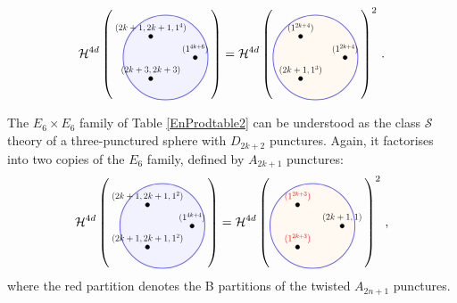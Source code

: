 \documentclass[a4paper,11pt]{article}
\begin{document}
\begin{compactitem}
\begin{equation}
   \mathcal{H}^{4d} \left( \raisebox{-.5\height}{\scalebox{.6}{\begin{tikzpicture}
        \filldraw[color=blue!60, fill=blue!5, very thick](0,0) circle (2);
        \filldraw[fill=black!100] (1.4,0) circle (.1);
        \filldraw[fill=black!100] (-.7,1) circle (.1);
        \filldraw[fill=black!100] (-.7,-1) circle (.1);
        \node at (1.4,.4) {\large $(1^{4k+6})$};
        \node at (-.7,1.4) {\large$(2k+1,2k+1,1^4)$};
        \node at (-.7,-.6) {\large$(2k+3,2k+3)$};
    \end{tikzpicture}}} \right) =  \mathcal{H}^{4d} \left( \raisebox{-.5\height}{\scalebox{.6}{\begin{tikzpicture}
        \filldraw[color=blue!60, fill=orange!5, very thick](0,0) circle (2);
        \filldraw[fill=black!100] (1.4,0) circle (.1);
        \filldraw[fill=black!100] (-.7,1) circle (.1);
        \filldraw[fill=black!100] (-.7,-1) circle (.1);
        \node at (1.4,.4) {\large $(1^{2k+4})$};
        \node at (-.7,1.4) {\large$(1^{2k+4})$};
        \node at (-.7,-.6) {\large$(2k+1,1^3)$};
    \end{tikzpicture}}} \right)^2 \, .
    \label{eq:class-S_E7xE7}
\end{equation}
%
\item The $E_6\times E_6$ family of Table \ref{EnProdtable2} can be understood as the class $\mathcal{S}$ theory of a three-punctured sphere with $D_{2k+2}$ punctures. Again, it factorises into two copies of the $E_6$ family, defined by $A_{2k+1}$ punctures: 
\begin{equation}
   \mathcal{H}^{4d} \left( \raisebox{-.5\height}{\scalebox{.6}{\begin{tikzpicture}
        \filldraw[color=blue!60, fill=blue!5, very thick](0,0) circle (2);
        \filldraw[fill=black!100] (1.4,0) circle (.1);
        \filldraw[fill=black!100] (-.7,1) circle (.1);
        \filldraw[fill=black!100] (-.7,-1) circle (.1);
        \node at (1.4,.4) {\large $(1^{4k+4})$};
        \node at (-.7,1.4) {\large$(2k+1,2k+1,1^2)$};
        \node at (-.7,-.6) {\large$(2k+1,2k+1,1^2)$};
    \end{tikzpicture}}} \right) =  \mathcal{H}^{4d} \left( \raisebox{-.5\height}{\scalebox{.6}{\begin{tikzpicture}
        \filldraw[color=blue!60, fill=orange!5, very thick](0,0) circle (2);
        \filldraw[fill=black!100] (1.4,0) circle (.1);
        \filldraw[fill=black!100] (-.7,1) circle (.1);
        \filldraw[fill=black!100] (-.7,-1) circle (.1);
        \node at (1.4,.4) {\large $(2k+1,1)$};
        \node at (-.7,1.4) {\textcolor{red}{\large$(1^{2k+3})$}};
        \node at (-.7,-.6) {\textcolor{red}{\large$(1^{2k+3})$}};
    \end{tikzpicture}}} \right)^2 \,,
    \label{eq:class-S_E6xE6}
\end{equation}
where the red partition denotes the B partitions of the twisted $A_{2n+1}$ punctures.
\end{compactitem}
\end{document}
